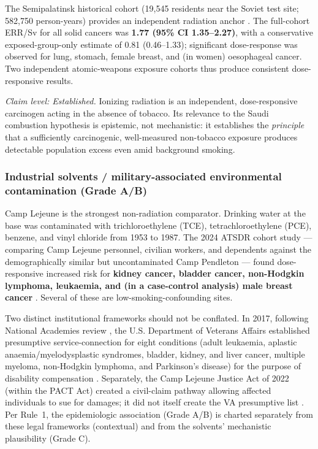\documentclass[3p,times]{elsarticle}
\begin{document}
The Semipalatinsk historical cohort (19,545 residents near the Soviet test site; 582,750 person-years) provides an independent radiation anchor \citep{bauer2005}. The full-cohort ERR/Sv for all solid cancers was \textbf{1.77 (95\% CI 1.35--2.27)}, with a conservative exposed-group-only estimate of 0.81 (0.46--1.33); significant dose-response was observed for lung, stomach, female breast, and (in women) oesophageal cancer. Two independent atomic-weapons exposure cohorts thus produce consistent dose-responsive results.

\emph{Claim level: Established.} Ionizing radiation is an independent, dose-responsive carcinogen acting in the absence of tobacco. Its relevance to the Saudi combustion hypothesis is epistemic, not mechanistic: it establishes the \emph{principle} that a sufficiently carcinogenic, well-measured non-tobacco exposure produces detectable population excess even amid background smoking.

\subsubsection{Industrial solvents / military-associated environmental contamination (Grade A/B)}
Camp Lejeune is the strongest non-radiation comparator. Drinking water at the base was contaminated with trichloroethylene (TCE), tetrachloroethylene (PCE), benzene, and vinyl chloride from 1953 to 1987. The 2024 ATSDR cohort study --- comparing Camp Lejeune personnel, civilian workers, and dependents against the demographically similar but uncontaminated Camp Pendleton --- found dose-responsive increased risk for \textbf{kidney cancer, bladder cancer, non-Hodgkin lymphoma, leukaemia, and (in a case-control analysis) male breast cancer} \citep{atsdr2024,ruckart2015}. Several of these are low-smoking-confounding sites.

Two distinct institutional frameworks should not be conflated. In 2017, following National Academies review \citep{nrc2009}, the U.S. Department of Veterans Affairs established presumptive service-connection for eight conditions (adult leukaemia, aplastic anaemia/myelodysplastic syndromes, bladder, kidney, and liver cancer, multiple myeloma, non-Hodgkin lymphoma, and Parkinson's disease) for the purpose of disability compensation \citep{va2017}. Separately, the Camp Lejeune Justice Act of 2022 (within the PACT Act) created a civil-claim pathway allowing affected individuals to sue for damages; it did not itself create the VA presumptive list \citep{clja2022}. Per Rule~1, the epidemiologic association (Grade A/B) is charted separately from these legal frameworks (contextual) and from the solvents' mechanistic plausibility (Grade C).
\end{document}
